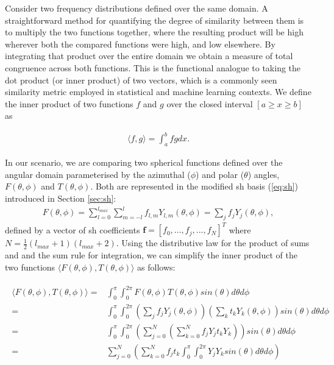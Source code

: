 Consider two frequency distributions defined over the same domain.
A straightforward method for quantifying the degree of similarity between them is to multiply the two functions together, where the resulting product will be high wherever both the compared functions were high, and low elsewhere.
By integrating that product over the entire domain we obtain a measure of total congruence across both functions.
This is the functional analogue to taking the dot product (or inner product) of two vectors, which is a commonly seen similarity metric employed in statistical and machine learning contexts.
We define the inner product of two functions $f$ and $g$ over the closed interval $[a \geq x \geq b]$ as

\begin{align}
  \langle f,g \rangle = \int_a^b f g dx.
\end{align}

In our scenario, we are comparing two spherical functions defined over the angular domain parameterised by the azimuthal ($\phi$) and polar ($\theta$) angles, $F(\theta, \phi)$ and $T(\theta, \phi)$.
Both are represented in the modified \gls{sh} basis (\ref{eq:sh}) introduced in Section \ref{sec:sh}:
\begin{align}
  F(\theta, \phi) = \sum_{l=0}^{l_{max}} \sum_{m=-l}^l f_{l,m} Y_{l,m}(\theta, \phi) = \sum_j f_jY_j(\theta, \phi),
\end{align}
defined by a vector of \gls{sh} coefficients $\mathbf{f} = [f_0, ..., f_j, ..., f_N]^T$ where $N = \frac{1}{2}(l_{max}+1)(l_{max}+2)$.
Using the distributive law for the product of sums and and the sum rule for integration, we can simplify the inner product of the two functions $\langle F(\theta, \phi), T(\theta, \phi) \rangle$ as follows:

\begin{align}
  \begin{split}
    \langle F(\theta, \phi), T(\theta, \phi) \rangle
    =& \int_0^{\pi} \int_0^{2\pi} F(\theta, \phi) T(\theta, \phi) sin(\theta) d\theta d\phi \\
    = & \int_0^{\pi} \int_0^{2\pi} (\sum_j f_jY_j(\theta, \phi)) (\sum_k t_kY_k(\theta, \phi)) sin(\theta) d\theta d\phi \\
    = & \int_0^{\pi} \int_0^{2\pi}  (\sum_{j=0}^N (\sum_{k=0}^N f_jY_j t_kY_k )) sin(\theta) d\theta d\phi \\
    = & \sum_{j=0}^N (\sum_{k=0}^N f_j t_k \int_0^{\pi} \int_0^{2\pi}  Y_j Y_k sin(\theta) d\theta d\phi )
  \end{split}\label{eq:ip1}
\end{align}

